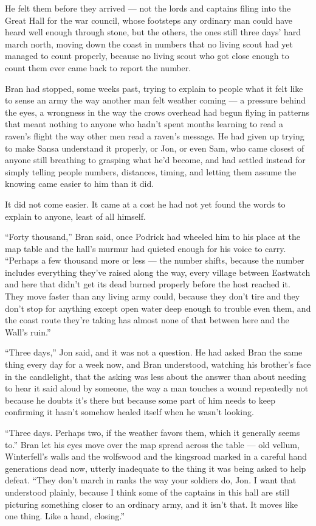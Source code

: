 He felt them before they arrived — not the lords and captains filing into the Great Hall for the war council, whose footsteps any ordinary man could have heard well enough through stone, but the others, the ones still three days’ hard march north, moving down the coast in numbers that no living scout had yet managed to count properly, because no living scout who got close enough to count them ever came back to report the number.

Bran had stopped, some weeks past, trying to explain to people what it felt like to sense an army the way another man felt weather coming — a pressure behind the eyes, a wrongness in the way the crows overhead had begun flying in patterns that meant nothing to anyone who hadn’t spent months learning to read a raven’s flight the way other men read a raven’s message. He had given up trying to make Sansa understand it properly, or Jon, or even Sam, who came closest of anyone still breathing to grasping what he’d become, and had settled instead for simply telling people numbers, distances, timing, and letting them assume the knowing came easier to him than it did.

It did not come easier. It came at a cost he had not yet found the words to explain to anyone, least of all himself.

\sceneBreak

“Forty thousand,” Bran said, once Podrick had wheeled him to his place at the map table and the hall’s murmur had quieted enough for his voice to carry. “Perhaps a few thousand more or less — the number shifts, because the number includes everything they’ve raised along the way, every village between Eastwatch and here that didn’t get its dead burned properly before the host reached it. They move faster than any living army could, because they don’t tire and they don’t stop for anything except open water deep enough to trouble even them, and the coast route they’re taking has almost none of that between here and the Wall’s ruin.”

“Three days,” Jon said, and it was not a question. He had asked Bran the same thing every day for a week now, and Bran understood, watching his brother’s face in the candlelight, that the asking was less about the answer than about needing to hear it said aloud by someone, the way a man touches a wound repeatedly not because he doubts it’s there but because some part of him needs to keep confirming it hasn’t somehow healed itself when he wasn’t looking.

“Three days. Perhaps two, if the weather favors them, which it generally seems to.” Bran let his eyes move over the map spread across the table — old vellum, Winterfell’s walls and the wolfswood and the kingsroad marked in a careful hand generations dead now, utterly inadequate to the thing it was being asked to help defeat. “They don’t march in ranks the way your soldiers do, Jon. I want that understood plainly, because I think some of the captains in this hall are still picturing something closer to an ordinary army, and it isn’t that. It moves like one thing. Like a hand, closing.”

